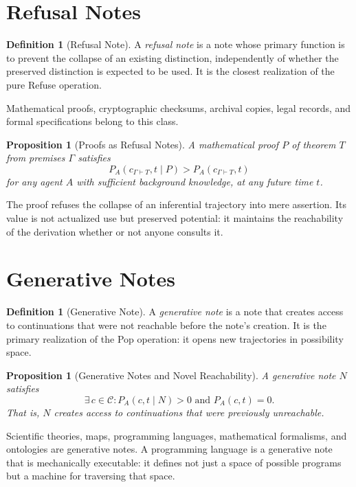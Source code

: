 \documentclass[12pt, a4paper, openany]{book}
\theoremstyle{plain}
\newtheorem{proposition}[theorem]{Proposition}
\theoremstyle{definition}
\newtheorem{definition}[theorem]{Definition}
\theoremstyle{remark}
\newcommand{\calC}{\mathcal{C}}
\begin{document}
\section{Refusal Notes}

\begin{definition}[Refusal Note]
A \emph{refusal note} is a note whose primary function is to prevent the collapse
of an existing distinction, independently of whether the preserved distinction is
expected to be used. It is the closest realization of the pure Refuse operation.
\end{definition}

Mathematical proofs, cryptographic checksums, archival copies, legal records, and
formal specifications belong to this class.

\begin{proposition}[Proofs as Refusal Notes]
A mathematical proof $P$ of theorem $T$ from premises $\Gamma$ satisfies
\[
P_A(c_{\Gamma \vdash T}, t \mid P) > P_A(c_{\Gamma \vdash T}, t)
\]
for any agent $A$ with sufficient background knowledge, at any future time $t$.
\end{proposition}

The proof refuses the collapse of an inferential trajectory into mere assertion.
Its value is not actualized use but preserved potential: it maintains the
reachability of the derivation whether or not anyone consults it.

\section{Generative Notes}

\begin{definition}[Generative Note]
A \emph{generative note} is a note that creates access to continuations that were
not reachable before the note's creation. It is the primary realization of the Pop
operation: it opens new trajectories in possibility space.
\end{definition}

\begin{proposition}[Generative Notes and Novel Reachability]
A generative note $N$ satisfies
\[
\exists\, c \in \calC : P_A(c, t \mid N) > 0 \text{ and } P_A(c, t) = 0.
\]
That is, $N$ creates access to continuations that were previously unreachable.
\end{proposition}

Scientific theories, maps, programming languages, mathematical formalisms, and
ontologies are generative notes. A programming language is a generative note that
is mechanically executable: it defines not just a space of possible programs but
a machine for traversing that space.
\end{document}
